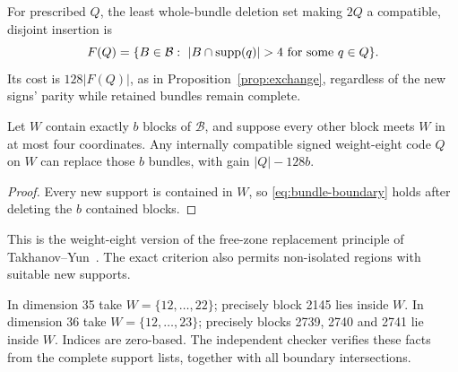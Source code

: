 For prescribed $Q$, the least whole-bundle deletion set making $2Q$
a compatible, disjoint insertion is
\[
 F(Q)=\{B\in\mathcal B:\ |B\cap\supp(q)|>4
                         \text{ for some }q\in Q\}.
\]
Its cost is $128|F(Q)|$, as in Proposition~\ref{prop:exchange},
regardless of the new signs' parity while retained bundles remain complete.

\begin{corollary}\label{lem:isolated-replacement}
Let $W$ contain exactly $b$ blocks of $\mathcal B$, and suppose every
other block meets $W$ in at most four coordinates. Any internally
compatible signed weight-eight code $Q$ on $W$ can replace those $b$
bundles, with gain $|Q|-128b$.
\end{corollary}
\begin{proof}
Every new support is contained in $W$, so
\eqref{eq:bundle-boundary} holds after deleting the $b$ contained blocks.
\end{proof}

This is the weight-eight version of the free-zone replacement principle
of Takhanov--Yun~\cite[Definition 5 and Lemma 4]{signed-johnson}.
The exact criterion also permits non-isolated regions with suitable
new supports.

In dimension 35 take $W=\{12,\ldots,22\}$; precisely block 2145 lies inside
$W$. In dimension 36 take $W=\{12,\ldots,23\}$; precisely blocks
2739, 2740 and 2741 lie inside $W$. Indices are zero-based. The independent
checker verifies these facts from the complete support lists, together with
all boundary intersections.

